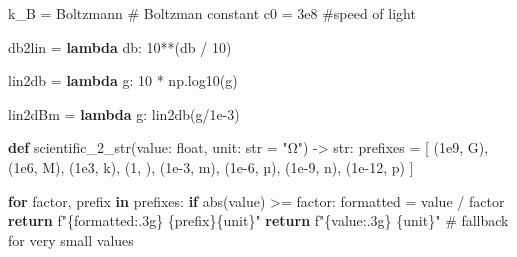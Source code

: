 \documentclass[
  letterpaper,
  DIV=11,
  numbers=noendperiod]{scrartcl}
\newenvironment{Shaded}{\begin{snugshade}}{\end{snugshade}}
\newcommand{\BuiltInTok}[1]{\textcolor[rgb]{0.00,0.23,0.31}{#1}}
\newcommand{\CommentTok}[1]{\textcolor[rgb]{0.37,0.37,0.37}{#1}}
\newcommand{\ControlFlowTok}[1]{\textcolor[rgb]{0.00,0.23,0.31}{\textbf{#1}}}
\newcommand{\DecValTok}[1]{\textcolor[rgb]{0.68,0.00,0.00}{#1}}
\newcommand{\FloatTok}[1]{\textcolor[rgb]{0.68,0.00,0.00}{#1}}
\newcommand{\KeywordTok}[1]{\textcolor[rgb]{0.00,0.23,0.31}{\textbf{#1}}}
\newcommand{\NormalTok}[1]{\textcolor[rgb]{0.00,0.23,0.31}{#1}}
\newcommand{\OperatorTok}[1]{\textcolor[rgb]{0.37,0.37,0.37}{#1}}
\newcommand{\SpecialCharTok}[1]{\textcolor[rgb]{0.37,0.37,0.37}{#1}}
\newcommand{\SpecialStringTok}[1]{\textcolor[rgb]{0.13,0.47,0.30}{#1}}
\newcommand{\StringTok}[1]{\textcolor[rgb]{0.13,0.47,0.30}{#1}}
\begin{document}
\begin{Shaded}
\begin{Highlighting}[]
\NormalTok{k\_B }\OperatorTok{=}\NormalTok{ Boltzmann     }\CommentTok{\# Boltzman constant}
\NormalTok{c0 }\OperatorTok{=} \FloatTok{3e8} \CommentTok{\#speed of light}

\NormalTok{db2lin }\OperatorTok{=} \KeywordTok{lambda}\NormalTok{ db: }\DecValTok{10}\OperatorTok{**}\NormalTok{(db }\OperatorTok{/} \DecValTok{10}\NormalTok{)}

\NormalTok{lin2db }\OperatorTok{=} \KeywordTok{lambda}\NormalTok{ g: }\DecValTok{10} \OperatorTok{*}\NormalTok{ np.log10(g)}

\NormalTok{lin2dBm }\OperatorTok{=} \KeywordTok{lambda}\NormalTok{ g: lin2db(g}\OperatorTok{/}\FloatTok{1e{-}3}\NormalTok{)}

\KeywordTok{def}\NormalTok{ scientific\_2\_str(value: }\BuiltInTok{float}\NormalTok{, unit: }\BuiltInTok{str} \OperatorTok{=} \StringTok{"Ω"}\NormalTok{) }\OperatorTok{{-}\textgreater{}} \BuiltInTok{str}\NormalTok{:}
\NormalTok{    prefixes }\OperatorTok{=}\NormalTok{ [}
\NormalTok{        (}\FloatTok{1e9}\NormalTok{, }\StringTok{\textquotesingle{}G\textquotesingle{}}\NormalTok{),}
\NormalTok{        (}\FloatTok{1e6}\NormalTok{, }\StringTok{\textquotesingle{}M\textquotesingle{}}\NormalTok{),}
\NormalTok{        (}\FloatTok{1e3}\NormalTok{, }\StringTok{\textquotesingle{}k\textquotesingle{}}\NormalTok{),}
\NormalTok{        (}\DecValTok{1}\NormalTok{, }\StringTok{\textquotesingle{}\textquotesingle{}}\NormalTok{),}
\NormalTok{        (}\FloatTok{1e{-}3}\NormalTok{, }\StringTok{\textquotesingle{}m\textquotesingle{}}\NormalTok{),}
\NormalTok{        (}\FloatTok{1e{-}6}\NormalTok{, }\StringTok{\textquotesingle{}µ\textquotesingle{}}\NormalTok{),}
\NormalTok{        (}\FloatTok{1e{-}9}\NormalTok{, }\StringTok{\textquotesingle{}n\textquotesingle{}}\NormalTok{),}
\NormalTok{        (}\FloatTok{1e{-}12}\NormalTok{, }\StringTok{\textquotesingle{}p\textquotesingle{}}\NormalTok{)    }
\NormalTok{    ]}

    \ControlFlowTok{for}\NormalTok{ factor, prefix }\KeywordTok{in}\NormalTok{ prefixes:}
        \ControlFlowTok{if} \BuiltInTok{abs}\NormalTok{(value) }\OperatorTok{\textgreater{}=}\NormalTok{ factor:}
\NormalTok{            formatted }\OperatorTok{=}\NormalTok{ value }\OperatorTok{/}\NormalTok{ factor}
            \ControlFlowTok{return} \SpecialStringTok{f"}\SpecialCharTok{\{}\NormalTok{formatted}\SpecialCharTok{:.3g\}}\SpecialStringTok{ }\SpecialCharTok{\{}\NormalTok{prefix}\SpecialCharTok{\}\{}\NormalTok{unit}\SpecialCharTok{\}}\SpecialStringTok{"}
    \ControlFlowTok{return} \SpecialStringTok{f"}\SpecialCharTok{\{}\NormalTok{value}\SpecialCharTok{:.3g\}}\SpecialStringTok{ }\SpecialCharTok{\{}\NormalTok{unit}\SpecialCharTok{\}}\SpecialStringTok{"}  \CommentTok{\# fallback for very small values}
\end{Highlighting}
\end{Shaded}
\end{document}
